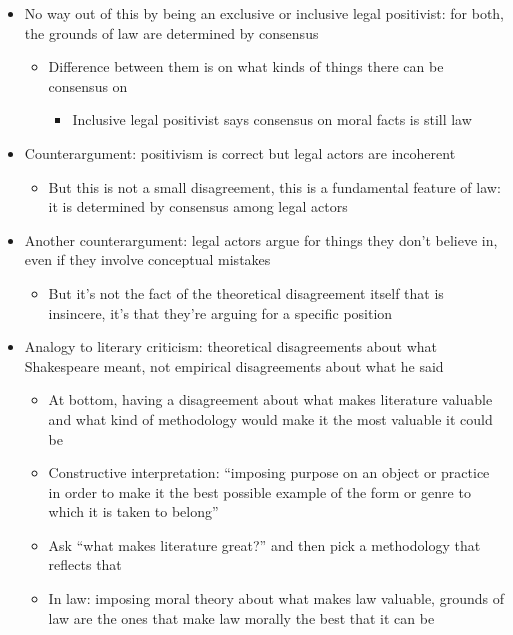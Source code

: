 \begin{itemize}
\tightlist
\item
  No way out of this by being an exclusive or inclusive legal
  positivist: for both, the grounds of law are determined by consensus

  \begin{itemize}
  \tightlist
  \item
    Difference between them is on what kinds of things there can be
    consensus on

    \begin{itemize}
    \tightlist
    \item
      Inclusive legal positivist says consensus on moral facts is still
      law
    \end{itemize}
  \end{itemize}
\item
  Counterargument: positivism is correct but legal actors are incoherent

  \begin{itemize}
  \tightlist
  \item
    But this is not a small disagreement, this is a fundamental feature
    of law: it is determined by consensus among legal actors
  \end{itemize}
\item
  Another counterargument: legal actors argue for things they don't
  believe in, even if they involve conceptual mistakes

  \begin{itemize}
  \tightlist
  \item
    But it's not the fact of the theoretical disagreement itself that is
    insincere, it's that they're arguing for a specific position
  \end{itemize}
\item
  Analogy to literary criticism: theoretical disagreements about what
  Shakespeare meant, not empirical disagreements about what he said

  \begin{itemize}
  \tightlist
  \item
    At bottom, having a disagreement about what makes literature
    valuable and what kind of methodology would make it the most
    valuable it could be
  \item
    Constructive interpretation: ``imposing purpose on an object or
    practice in order to make it the best possible example of the form
    or genre to which it is taken to belong''
  \item
    Ask ``what makes literature great?'' and then pick a methodology
    that reflects that
  \item
    In law: imposing moral theory about what makes law valuable, grounds
    of law are the ones that make law morally the best that it can be


\end{itemize}
\end{itemize}
